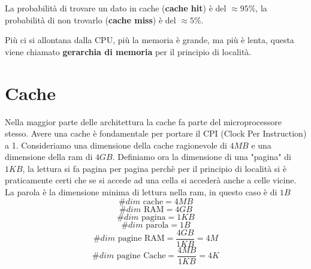 \documentclass[a4paper]{article}
\theoremstyle{break}
\theoremstyle{break}
\theoremstyle{break}
\theoremstyle{break}
\begin{document}
\noindent La probabilità di trovare un dato in cache (\textbf{cache hit}) è del \( \approx 95\% \),
la probabilità di non trovarlo (\textbf{cache miss}) è del \( \approx 5\% \).

\vspace{1em}
\noindent Più ci si allontana dalla CPU, più la memoria è grande, ma più è lenta, questa
viene chiamato \textbf{gerarchia di memoria} per il principio di località.

\section{Cache}
Nella maggior parte delle architettura la cache fa parte del microprocessore stesso.
Avere una cache è fondamentale per portare il CPI (Clock Per Instruction) a 1.
Consideriamo una dimensione della cache ragionevole di \( 4MB \) e una dimensione
della ram di \( 4GB \). Definiamo ora la dimensione di una "pagina" di \( 1KB \), la
lettura si fa pagina per pagina perchè per il principio di località si è praticamente
certi che se si accede ad una cella si accederà anche a celle vicine. La parola è
la dimensione minima di lettura nella ram, in questo caso è di \( 1B \) 
\[
\#dim \text{ cache} = 4MB
\] 
\[
\#dim \text{ RAM} = 4GB
\] 
\[
\#dim \text{ pagina} = 1KB
\] 
\[
\#dim \text{ parola} = 1B
\] 
\[
\#dim \text{ pagine RAM} = \frac{4GB}{1KB} = 4M
\] 
\[
\#dim \text{ pagine Cache} = \frac{4MB}{1KB} = 4K
\] 

\begin{figure}[H]
  \centering
\end{figure}
\end{document}
